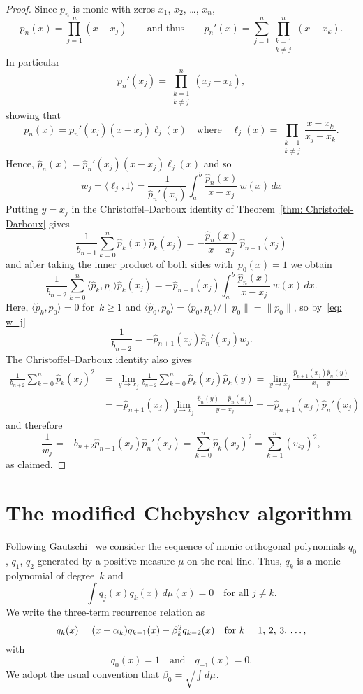 \documentclass[12pt,a4paper]{article}
\newcommand{\iprod}[1]{\langle#1\rangle}
\begin{document}
\begin{proof}
Since $p_n$ is monic with zeros $x_1$, $x_2$, \dots, $x_n$,
\[
p_n(x)=\prod_{j=1}^n(x-x_j)
\qquad\text{and thus}\qquad
p_n'(x)=\sum_{j=1}^n\prod_{\substack{k=1\\ k\ne j}}^n(x-x_k).
\]
In particular
\[
p_n'(x_j)=\prod_{\substack{k=1\\ k\ne j}}^n(x_j-x_k),
\]
showing that
\[
p_n(x)=p_n'(x_j)(x-x_j)\ell_j(x)\quad\text{where}\quad
\ell_j(x)=\prod_{\substack{k-1\\ k\ne j}}\frac{x-x_k}{x_j-x_k}.
\]
Hence, $\hat p_n(x)=\hat p_n'(x_j)(x-x_j)\ell_j(x)$ and so
\begin{equation}\label{eq: w_j}
w_j=\iprod{\ell_j,1}=\frac{1}{\hat p_n'(x_j)}
	\int_a^b\frac{\hat p_n(x)}{x-x_j}\,w(x)\,dx
\end{equation}
Putting $y=x_j$ in the Christoffel--Darboux identity of 
Theorem~\ref{thm: Christoffel-Darboux} gives
\[
\frac{1}{b_{n+1}}\sum_{k=0}^n\hat p_k(x)\hat p_k(x_j)
	=-\frac{\hat p_n(x)}{x-x_j}\,\hat p_{n+1}(x_j)
\]
and after taking the inner product of both sides with~$p_0(x)=1$
we obtain
\[
\frac{1}{b_{n+2}}\sum_{k=0}^n\iprod{\hat p_k,p_0}\hat p_k(x_j)
	=-\hat p_{n+1}(x_j)\int_a^b\frac{\hat p_n(x)}{x-x_j}\,w(x)\,dx.
\]
Here, $\iprod{\hat p_k,p_0}=0$ for~$k\ge1$ and 
$\iprod{\hat p_0,p_0}=\iprod{p_0,p_0}/\|p_0\|=\|p_0\|$, so 
by~\eqref{eq: w_j}
\[
\frac{1}{b_{n+2}}=-\hat p_{n+1}(x_j)\hat p_n'(x_j)w_j.
\]
The Christoffel--Darboux identity also gives
\begin{align*}
\frac{1}{b_{n+2}}\sum_{k=0}^n\hat p_k(x_j)^2
&=\lim_{y\to x_j}\frac{1}{b_{n+2}}\sum_{k=0}^n
	\hat p_k(x_j)\hat p_k(y)
=\lim_{y\to x_j}\frac{\hat p_{n+1}(x_j)\hat p_n(y)}{x_j-y}\\
&=-\hat p_{n+1}(x_j)\lim_{y\to x_j}
	\frac{\hat p_n(y)-\hat p_n(x_j)}{y-x_j}
	=-\hat p_{n+1}(x_j)\hat p_n'(x_j) 
\end{align*}
and therefore
\[
\frac{1}{w_j}=-b_{n+2}\hat p_{n+1}(x_j)\hat p_n'(x_j)
	=\sum_{k=0}^n\hat p_k(x_j)^2=\sum_{k=1}^n(v_{kj})^2,
\]
as claimed.
\end{proof}


\section{The modified Chebyshev algorithm}
Following Gautschi~\cite{Gautschi1982} we consider the sequence of 
monic orthogonal polynomials $q_0$, $q_1$, $q_2$ generated by a 
positive measure $\mu$ on the real line.  Thus, $q_k$ is a monic 
polynomial of degree~$k$ and
\[
\int q_j(x)q_k(x)\,d\mu(x)=0\quad\text{for all $j\ne k$.}
\]
We write the three-term recurrence relation as
\begin{equation}\label{eq: 3 term q}
q_k(x)=(x-\alpha_k)q_{k-1}(x)-\beta_k^2 q_{k-2}(x)
	\quad\text{for $k=1$, $2$, $3$, \dots,}
\end{equation}
with
\[
q_0(x)=1\quad\text{and}\quad q_{-1}(x)=0.
\]
We adopt the usual convention that $\beta_0=\sqrt{\int d\mu}$.
\end{document}
